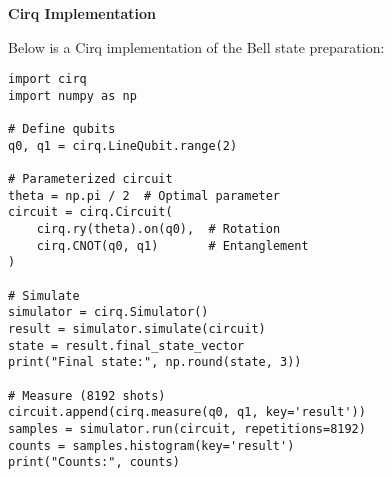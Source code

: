 \vspace{0.3cm}


\vspace{0.3cm}


\noindent
\textbf{Cirq Implementation}

Below is a Cirq implementation of the Bell state preparation:

\begin{verbatim}
import cirq
import numpy as np

# Define qubits
q0, q1 = cirq.LineQubit.range(2)

# Parameterized circuit
theta = np.pi / 2  # Optimal parameter
circuit = cirq.Circuit(
    cirq.ry(theta).on(q0),  # Rotation
    cirq.CNOT(q0, q1)       # Entanglement
)

# Simulate
simulator = cirq.Simulator()
result = simulator.simulate(circuit)
state = result.final_state_vector
print("Final state:", np.round(state, 3))

# Measure (8192 shots)
circuit.append(cirq.measure(q0, q1, key='result'))
samples = simulator.run(circuit, repetitions=8192)
counts = samples.histogram(key='result')
print("Counts:", counts)
\end{verbatim}

